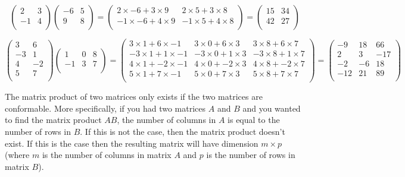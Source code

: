 \documentclass[a4paper,oneside]{report}
\begin{document}
\[ \begin{pmatrix}
	2 & 3 \\
	-1 & 4 \\
\end{pmatrix} \begin{pmatrix}
	-6 & 5 \\
	9 & 8 \\
\end{pmatrix} = \begin{pmatrix}
	2 \times -6 + 3 \times 9 & 2 \times 5 + 3 \times 8 \\
	-1 \times -6 + 4 \times 9 & -1 \times 5 + 4 \times 8 \\
\end{pmatrix} = \begin{pmatrix}
	15 & 34 \\
	42 & 27 \\
\end{pmatrix} \]

\[ \begin{pmatrix}
	3 & 6 \\
	-3 & 1 \\
	4 & -2 \\
	5 & 7 \\
\end{pmatrix} \begin{pmatrix}
	1 & 0 & 8 \\
	-1 & 3 & 7 \\
\end{pmatrix} = \begin{pmatrix}
	3 \times 1 + 6 \times -1 & 3 \times 0 + 6 \times 3 & 3 \times 8 + 6 \times 7 \\
	-3 \times 1 + 1 \times -1 & -3 \times 0 + 1 \times 3 & -3 \times 8 + 1 \times 7 \\
	4 \times 1 + -2 \times -1 & 4 \times 0 + -2 \times 3 & 4 \times 8 + -2 \times 7 \\
	5 \times 1 + 7 \times -1 & 5 \times 0 + 7 \times 3 & 5 \times 8 + 7 \times 7 \\
\end{pmatrix} = \begin{pmatrix}
	-9 & 18 & 66 \\
	2 & 3 & -17 \\
	-2 & -6 & 18 \\
	-12 & 21 & 89 \\
\end{pmatrix} \]

The matrix product of two matrices only exists if the two matrices are
conformable. More specifically, if you had two matrices \( A \) and \( B \)
and you wanted to find the matrix product \( AB \), the number of columns in
\( A \) is equal to the number of rows in \( B \). If this is not the case,
then the matrix product doesn't exist. If this is the case then the resulting
matrix will have dimension \( m \times p \) (where \( m \) is the number of
columns in matrix \( A \) and \( p \) is the number of rows in matrix
\( B \)).
\end{document}
